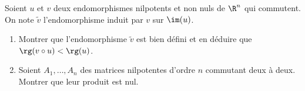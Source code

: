 \begin{enonce}
\begin{exercise}[ID={RMS135 E1413},subtitle={IMT MP 2024},tags={},difficulty={}]
  Soient $u$ et $v$ deux endomorphismes nilpotents et non nuls de $\R^n$ qui commutent.
  On note $\tilde{v}$ l’endomorphisme induit par $v$ sur $\im(u)$.
\begin{enumerate}
  \item Montrer que l’endomorphisme $\tilde{v}$ est bien défini et en déduire que $\rg(v \circ u) < \rg(u)$.
  \item Soient $A_1, \dots, A_n$ des matrices nilpotentes d’ordre $n$ commutant deux à deux. Montrer que leur produit est nul.
\end{enumerate}
\end{exercise}
\begin{solution}
\end{solution}
\end{enonce}
